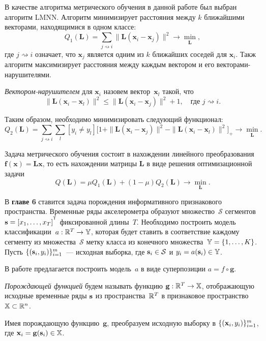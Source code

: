 \documentclass[11pt, a5paper]{dissert}
\begin{document}
В качестве алгоритма метрического обучения в данной работе был выбран алгоритм LMNN. 
Алгоритм минимизирует расстояния между $k$ ближайшими векторами, находящимися в одном классе:
\[
	Q_1(\mathbf{L}) = \sum_{j \rightsquigarrow i} \|\mathbf{L}(\mathbf{x}_i - \mathbf{x}_j)\|^2 \rightarrow \min_{\mathbf{L}},
\]
где $j \rightsquigarrow i$ означает, что $\mathbf{x}_j$ является одним из $k$ ближайших соседей для $\mathbf{x}_i$.
Такж алгоритм максимизирует расстояния между каждым вектором и его векторами-нарушителями. 
\begin{definition}
	\textit{Вектором-нарушителем} для $\mathbf{x}_i$ назовем вектор~$\mathbf{x}_l$ такой, что
	\begin{equation}
		\label{ch5:eq:impostor}
		\|\mathbf{L}(\mathbf{x}_i - \mathbf{x}_l)\|^2 \leq \|\mathbf{L}(\mathbf{x}_i - \mathbf{x}_j)\|^2 + 1, \quad \text{где $j \rightsquigarrow i$}.
	\end{equation}
\end{definition}
Таким образом, необходимо минимизировать следующий функционал:
\[
	Q_2(\mathbf{L}) = \sum_{j \rightsquigarrow i} \sum_l [y_i \neq y_l] \bigl[1 + \|\mathbf{L}(\mathbf{x}_i - \mathbf{x}_j)\|^2 - \|\mathbf{L}(\mathbf{x}_i - \mathbf{x}_l)\|^2\bigr]_+ \rightarrow \min_{\mathbf{L}}.
\]

Задача метрического обучения состоит в нахождении линейного преобразования $\mathbf{f}(\mathbf{x}) = \mathbf{Lx}$, то есть нахождении матрицы $\mathbf{L}$ в виде решения оптимизационной задачи
\begin{equation}
	\label{ch5:eq:Qmin}
	Q(\mathbf{L}) = \mu Q_1(\mathbf{L}) + (1 - \mu) Q_2(\mathbf{L}) \rightarrow \min_{\mathbf{L}}.
\end{equation}

В \textbf{главе 6} ставится задача порождения информативного признакового пространства.
Временные ряды акселерометра образуют множество~$\mathcal{S}$ сегментов~$\bs = [x_1, \dots, x_T]^{\T}$ фиксированной длины~$T$.
Необходимо построить модель классификации~$a: \mathbb{R}^T \rightarrow \mathbb{Y}$, которая будет ставить в соответствие каждому сегменту из множества~$\mathcal{S}$ метку класса из конечного множества~$\mathbb{Y} = \{1, \dots, K\}$.
Пусть $\{(\mathbf{s}_i, y_i)\}_{i=1}^m$~--- исходная выборка, где $\mathbf{s}_i \in \mathcal{S}$ и $y_i = a(\mathbf{s}_i)\in \mathbb{Y}$.

В работе предлагается построить модель~$a$ в виде суперпозиции $a = f \circ \mathbf{g}$.
\vspace{0.1cm}
\begin{definition}
	\textit{Порождающей функцией} будем называть функцию $\mathbf{g}: \mathbb{R}^T \rightarrow \mathbb{X}$, отображающую исходные временные ряды $\mathbf{s}$ из пространства~$\mathbb{R}^{T} $ в признаковое пространство~$\mathbb{X} \subset \mathbb{R}^n$.
\end{definition}
Имея порождающую функцию~$\mathbf{g}$, преобразуем исходную выборку в $\{(\mathbf{x}_i, y_i)\}_{i=1}^m$, где $\mathbf{x}_i = \mathbf{g}(\mathbf{s}_i) \in \mathbb{X}$. 
\end{document}
